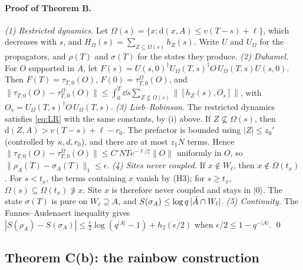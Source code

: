 \paragraph{Proof of Theorem B.}
\emph{(1) Restricted dynamics.} Let $\Omega(s)=\{x:\mathrm d(x,A)\le v(T-s)+\ell\}$, which decreases with $s$, and $H_\Omega(s)=\sum_{Z\subseteq\Omega(s)}h_Z(s)$. Write $U$ and $U_\Omega$ for the propagators, and $\rho(T)$ and $\sigma(T)$ for the states they produce.
\emph{(2) Duhamel.} For $O$ supported in $A$, let $F(s)=U(s,0)^\dagger U_\Omega(T,s)^\dagger O\,U_\Omega(T,s)U(s,0)$. Then $F(T)=\tau_{T,0}(O)$, $F(0)=\tau^\Omega_{T,0}(O)$, and
$\|\tau_{T,0}(O)-\tau^\Omega_{T,0}(O)\|\le\int_0^T\dd s\sum_{Z\not\subseteq\Omega(s)}\|[h_Z(s),O_s]\|$, with $O_s=U_\Omega(T,s)^\dagger O\,U_\Omega(T,s)$.
\emph{(3) Lieb--Robinson.} The restricted dynamics satisfies \eqref{eq:LR} with the same constants, by (i) above. If $Z\not\subseteq\Omega(s)$, then $\mathrm d(Z,A)>v(T-s)+\ell-r_0$. The prefactor is bounded using $|Z|\le z_0'$ (controlled by $\kappa,d,r_0$), and there are at most $z_1N$ terms. Hence $\|\tau_{T,0}(O)-\tau^\Omega_{T,0}(O)\|\le C'NTe^{-\ell/\xi}\|O\|$ uniformly in $O$, so $\|\rho_A(T)-\sigma_A(T)\|_1\le\epsilon$.
\emph{(4) Sites never coupled.} If $x\notin W_\ell$, then $x\notin\Omega(t_x)$. For $s<t_x$, the terms containing $x$ vanish by (H3); for $s\ge t_x$, $\Omega(s)\subseteq\Omega(t_x)\not\ni x$. Site $x$ is therefore never coupled and stays in $|0\rangle$. The state $\sigma(T)$ is pure on $W_\ell\supseteq A$, and $S(\sigma_A)\le\log q\,|\bar A\cap W_\ell|$.
\emph{(5) Continuity.} The Fannes--Audenaert inequality \cite{Fannes1973,Audenaert2007} gives $|S(\rho_A)-S(\sigma_A)|\le\frac{\epsilon}{2}\log(q^{|A|}-1)+h_2(\epsilon/2)$ when $\epsilon/2\le1-q^{-|A|}$.
\qed

\subsection{Theorem C(b): the rainbow construction}\label{app:C}

